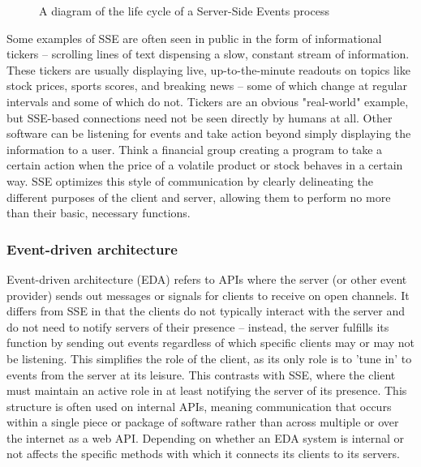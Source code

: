 \begin{figure}[!ht]
	\begin{center}
		\caption{A diagram of the life cycle of a Server-Side Events process}\label{ssediagram}
	\end{center}
\end{figure}

Some examples of SSE are often seen in public in the form of informational tickers -- scrolling lines of text dispensing a slow, constant stream of information. These tickers are usually displaying live, up-to-the-minute readouts on topics like stock prices, sports scores, and breaking news -- some of which change at regular intervals and some of which do not. Tickers are an obvious "real-world" example, but SSE-based connections need not be seen directly by humans at all. Other software can be listening for events and take action beyond simply displaying the information to a user. Think a financial group creating a program to take a certain action when the price of a volatile product or stock behaves in a certain way. SSE optimizes this style of communication by clearly delineating the different purposes of the client and server, allowing them to perform no more than their basic, necessary functions.

\subsubsection{Event-driven architecture}

Event-driven architecture (EDA) refers to APIs where the server (or other event provider) sends out messages or signals for clients to receive on open channels. It differs from SSE in that the clients do not typically interact with the server and do not need to notify servers of their presence -- instead, the server fulfills its function by sending out events regardless of which specific clients may or may not be listening. This simplifies the role of the client, as its only role is to 'tune in' to events from the server at its leisure. This contrasts with SSE, where the client must maintain an active role in at least notifying the server of its presence. This structure is often used on internal APIs, meaning communication that occurs within a single piece or package of software rather than across multiple or over the internet as a web API. Depending on whether an EDA system is internal or not affects the specific methods with which it connects its clients to its servers.

